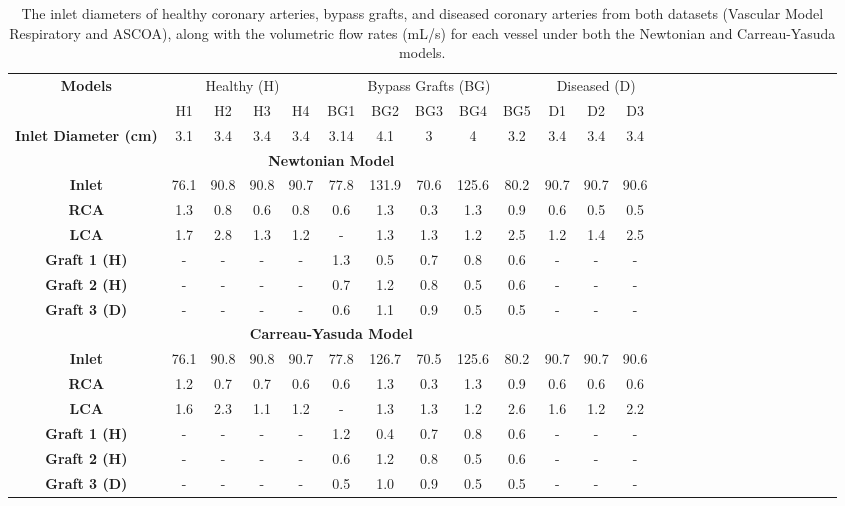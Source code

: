 ﻿\documentclass[12pt,a4paper]{article}
\theoremstyle{definition}
\numberwithin{equation}{section}
\begin{document}
\begin{table}[h!]
\centering
    \setlength{\tabcolsep}{2.9pt}
    \renewcommand{\arraystretch}{0.9}
    \caption{The inlet diameters of healthy coronary arteries, bypass grafts, and diseased coronary arteries from both datasets (Vascular Model Respiratory and ASCOA), along with the volumetric flow rates (mL/s) for each vessel under both the Newtonian and Carreau-Yasuda models.}
    \begin{tabular}{|c|c|c|c|c|c|c|c|c|c|c|c|c|c|c|c|c|c|c|c|c|c|c|c|c|c|} 
    \hline 
    \multirow{2}{*}{\textbf{Models}} & \multicolumn{4}{c|}{Healthy (H)} & \multicolumn{5}{c|}{Bypass Grafts (BG)} &\multicolumn{3}{c|}{Diseased (D)} \\ \cline{2-13} & H1 & H2 & H3 & H4 & BG1 & BG2 & BG3 & BG4 & BG5 & D1 & D2 & D3 \\ \hline
  \textbf{Inlet Diameter (cm)}& 3.1 & 3.4 & 3.4 & 3.4& 3.14 & 4.1 & 3 & 4 & 3.2 & 3.4 &3.4& 3.4  \\ \hline \multicolumn{13}{|c|}{\textbf{Newtonian Model}}\\ \hline  \textbf{Inlet}& 76.1 & 90.8 & 90.8 & 90.7& 77.8 & 131.9 & 70.6 & 125.6 & 80.2 & 90.7 &90.7& 90.6  \\ \hline  \textbf{RCA}& 1.3 & 0.8 & 0.6 & 0.8& 0.6 & 1.3 & 0.3 & 1.3 & 0.9 & 0.6 &0.5& 0.5  \\ \hline  \textbf{LCA}& 1.7 & 2.8 & 1.3 & 1.2& - & 1.3 & 1.3 & 1.2 & 2.5 & 1.2 &1.4& 2.5  \\ \hline 
   \textbf{Graft 1 (H)}& - & - & - & -& 1.3 & 0.5 & 0.7 & 0.8 & 0.6 & - &-& -  \\ \hline 
   \textbf{Graft 2 (H)}& - & - & - & -& 0.7 & 1.2 & 0.8 & 0.5 & 0.6 & - &-& - \\ \hline 
   \textbf{Graft 3 (D)}& - & - & - & -& 0.6 & 1.1 & 0.9 & 0.5 & 0.5 & - &-& - \\ \hline 
   \multicolumn{13}{|c|}{\textbf{Carreau-Yasuda Model}}\\ \hline  \textbf{Inlet}& 76.1 & 90.8 & 90.8 & 90.7& 77.8 & 126.7 & 70.5 & 125.6 & 80.2 & 90.7 &90.7& 90.6  \\ \hline  \textbf{RCA}& 1.2 & 0.7 & 0.7 & 0.6& 0.6 & 1.3 & 0.3 & 1.3 & 0.9 & 0.6 &0.6& 0.6  \\ \hline  \textbf{LCA}& 1.6 & 2.3 & 1.1 & 1.2& - & 1.3 & 1.3 & 1.2 & 2.6 & 1.6 &1.2& 2.2  \\ \hline 
   \textbf{Graft 1 (H)}& - & - & - & -& 1.2 & 0.4 & 0.7 & 0.8 & 0.6 & - &-& -  \\ \hline 
   \textbf{Graft 2 (H)}& - & - & - & -& 0.6 & 1.2 & 0.8 & 0.5 & 0.6 & - &-& - \\ \hline 
   \textbf{Graft 3 (D)}& - & - & - & -& 0.5 & 1.0 & 0.9 & 0.5 & 0.5 & - &-& - 
    \\ \hline
       \end{tabular}
    \label{tab:a}
\end{table}
\end{document}
